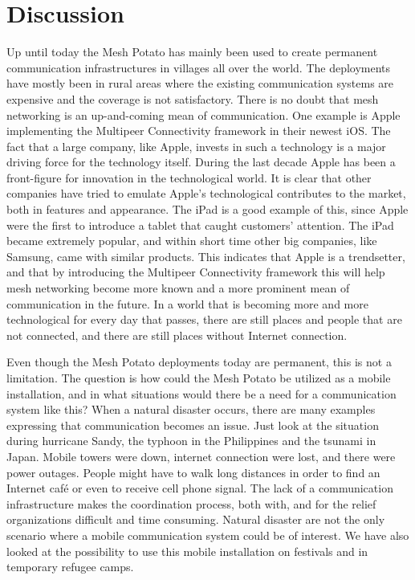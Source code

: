 \chapter{Discussion}
\label{chp:discussion} 

Up until today the Mesh Potato has mainly been used to create permanent communication infrastructures in villages all over the world. The deployments have mostly been in rural areas where the existing communication systems are expensive and the coverage is not satisfactory. There is no doubt that mesh networking is an up-and-coming mean of communication. One example is Apple implementing the Multipeer Connectivity framework in their newest iOS. The fact that a large company, like Apple, invests in such a technology is a major driving force for the technology itself. During the last decade Apple has been a front-figure for innovation in the technological world. It is clear that other companies have tried to emulate Apple's technological contributes to the market, both in features and appearance. The iPad is a good example of this, since Apple were the first to introduce a tablet that caught customers' attention. The iPad became extremely popular, and within short time other big companies, like Samsung, came with similar products. This indicates that Apple is a trendsetter, and that by introducing the Multipeer Connectivity framework this will help mesh networking become more known and a more prominent mean of communication in the future. In a world that is becoming more and more technological for every day that passes, there are still places and people that are not connected, and there are still places without Internet connection. 

Even though the Mesh Potato deployments today are permanent, this is not a limitation. The question is how could the Mesh Potato be utilized as a mobile installation, and in what situations would there be a need for a communication system like this? When a natural disaster occurs, there are many examples expressing that communication becomes an issue. Just look at the situation during hurricane Sandy, the typhoon in the Philippines and the tsunami in Japan. Mobile towers were down, internet connection were lost, and there were power outages. People might have to walk long distances in order to find an Internet café or even to receive cell phone signal. The lack of a communication infrastructure makes the coordination process, both with, and for the relief organizations difficult and time consuming. Natural disaster are not the only scenario where a mobile communication system could be of interest. We have also looked at the possibility to use this mobile installation on festivals and in temporary refugee camps. 

